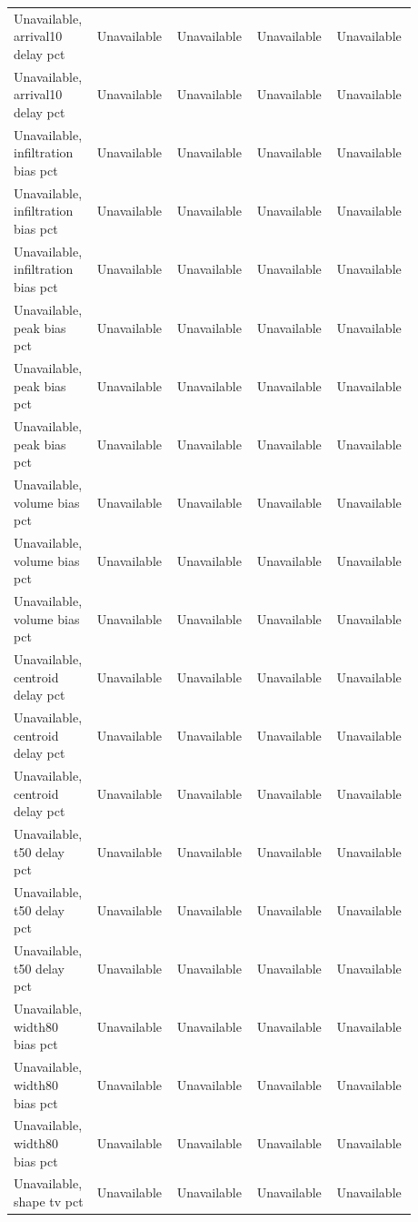 \begin{longtable}{p{0.1760\linewidth}p{0.1760\linewidth}p{0.1760\linewidth}p{0.1760\linewidth}p{0.1760\linewidth}}
Unavailable, arrival10 delay pct & Unavailable & Unavailable & Unavailable & Unavailable \\
Unavailable, arrival10 delay pct & Unavailable & Unavailable & Unavailable & Unavailable \\
Unavailable, infiltration bias pct & Unavailable & Unavailable & Unavailable & Unavailable \\
Unavailable, infiltration bias pct & Unavailable & Unavailable & Unavailable & Unavailable \\
Unavailable, infiltration bias pct & Unavailable & Unavailable & Unavailable & Unavailable \\
Unavailable, peak bias pct & Unavailable & Unavailable & Unavailable & Unavailable \\
Unavailable, peak bias pct & Unavailable & Unavailable & Unavailable & Unavailable \\
Unavailable, peak bias pct & Unavailable & Unavailable & Unavailable & Unavailable \\
Unavailable, volume bias pct & Unavailable & Unavailable & Unavailable & Unavailable \\
Unavailable, volume bias pct & Unavailable & Unavailable & Unavailable & Unavailable \\
Unavailable, volume bias pct & Unavailable & Unavailable & Unavailable & Unavailable \\
Unavailable, centroid delay pct & Unavailable & Unavailable & Unavailable & Unavailable \\
Unavailable, centroid delay pct & Unavailable & Unavailable & Unavailable & Unavailable \\
Unavailable, centroid delay pct & Unavailable & Unavailable & Unavailable & Unavailable \\
Unavailable, t50 delay pct & Unavailable & Unavailable & Unavailable & Unavailable \\
Unavailable, t50 delay pct & Unavailable & Unavailable & Unavailable & Unavailable \\
Unavailable, t50 delay pct & Unavailable & Unavailable & Unavailable & Unavailable \\
Unavailable, width80 bias pct & Unavailable & Unavailable & Unavailable & Unavailable \\
Unavailable, width80 bias pct & Unavailable & Unavailable & Unavailable & Unavailable \\
Unavailable, width80 bias pct & Unavailable & Unavailable & Unavailable & Unavailable \\
Unavailable, shape tv pct & Unavailable & Unavailable & Unavailable & Unavailable \\

\end{longtable}
